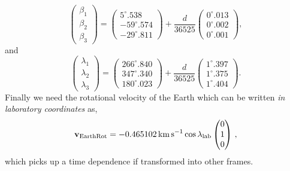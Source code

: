 \begin{equation}
\begin{pmatrix} \beta_1 \\ \beta_2 \\ \beta_3 \end{pmatrix} = \begin{pmatrix}5^\circ.538\\-59^\circ.574\\-29^\circ.811\end{pmatrix} +
\frac{d}{36525}\begin{pmatrix}0^\circ.013\\0^\circ.002\\0^\circ.001\end{pmatrix},
\end{equation}
and
\begin{equation}
\begin{pmatrix} \lambda_1 \\ \lambda_2 \\ \lambda_3 \end{pmatrix} = \begin{pmatrix}266^\circ.840\\347^\circ.340\\180^\circ.023\end{pmatrix} +
\frac{d}{36525}\begin{pmatrix}1^\circ.397\\1^\circ.375\\1^\circ.404\end{pmatrix} .
\end{equation}
Finally we need the rotational velocity of the Earth which can be written {\it in laboratory coordinates} as,
\begin{equation}
\textbf{v}_\textrm{EarthRot} = -0.465102 {\rm \, km \, s}^{-1} \cos{\lambda_{\rm lab}} \begin{pmatrix}0\\1\\0\end{pmatrix} \, ,
\end{equation}
which picks up a time dependence if transformed into other frames.